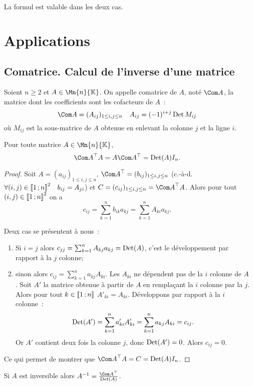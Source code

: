 La formul est valable dans les deux cas.


\section{Applications}

\subsection{Comatrice. Calcul de l'inverse d'une matrice}

\begin{defdef}
  Soient $n \geq 2$ et $A \in \Mn{n}{\K}$. On appelle comatrice de $A$, noté $\Com A$, la matrice dont les coefficients sont les cofacteurs de $A$~:
  \begin{equation}
    \Com A = (A_{ij})_{1 \leq i,j \leq n} \quad A_{ij}=(-1)^{i+j} \Det M_{ij}
  \end{equation}
  où $M_{ij}$ est la sous-matrice de $A$ obtenue en enlevant la colonne $j$ et la ligne $i$.
\end{defdef}

\begin{prop}
  Pour toute matrice $A \in \Mn{n}{\K}$,
  \begin{equation}
    {\Com A}^{\top} A = A {\Com A}^{\top} = \Det(A) I_n.
  \end{equation}
\end{prop}
\begin{proof}
  Soit $A=(a_{ij})_{1 \leq i,j \leq n}$, ${\Com A}^{\top} = (b_{ij})_{1 \leq i,j \leq n}$ (c.-à-d. $\forall (i,j) \in \mathopen{\llbracket}1\mathclose{}\mathpunct{};n\mathclose{\rrbracket}^2 \quad b_{ij}=A_{ji}$) et $C=(c_{ij})_{1 \leq i,j \leq n}={\Com A}^{\top} A$. Alors pour tout $(i,j) \in \mathopen{\llbracket}1\mathclose{}\mathpunct{};n\mathclose{\rrbracket}^2$ on a
  \begin{equation}
    c_{ij} = \sum_{k=1}^n b_{ik}a_{kj} = \sum_{k=1}^n A_{ki} a_{kj}.
  \end{equation}

Deux cas se présentent à nous~:
\begin{enumerate}
\item Si $i=j$ alors $c_{jj} = \sum_{k=1}^n A_{kj} a_{kj} = \operatorname{Det}(A)$, c'est le développement par rapport à la $j$\ieme{} colonne;
\item sinon alors $c_{ij} = \sum_{k=1}^n a_{kj} A_{ki}$. Les $A_{ki}$ ne dépendent pas de la $i$\ieme{} colonne de $A$. Soit $A'$ la matrice obtenue à partir de $A$ en remplaçant la $i$\ieme{} colonne par la $j$\ieme{}. Alors pour tout $k \in \mathopen{\llbracket}1\mathclose{}\mathpunct{};n\mathclose{\rrbracket}$ $A'_{ki}=A_{ki}$. Développons par rapport à la $i$\ieme{} colonne~:
  \begin{equation}
    \operatorname{Det}(A') = \sum_{k=1}^n a'_{ki} A'_{ki} = \sum_{k=1}^n a_{kj} A_{ki} =c_{ij}.
  \end{equation}
  Or $A'$ contient deux fois la colonne $j$, donc $\operatorname{Det}(A')=0$. Alors $c_{ij}=0$.
\end{enumerate}

Ce qui permet de montrer que ${\Com A}^{\top} A = C = \Det(A) I_n$.
\end{proof}
\begin{corth}
  Si $A$ est inversible alors $A^{-1} = \frac{{\Com A}^{\top}}{\Det(A)}$.
\end{corth}


